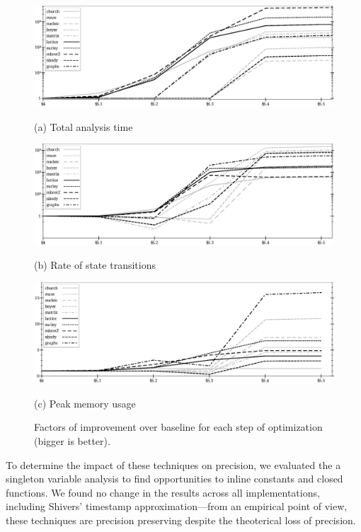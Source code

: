 \documentclass[preprint,onecolumn,9pt]{sigplanconf} %
\begin{document}
\begin{figure}
\begin{center}
  \includegraphics[width=6.5in]{all-relative-time}

  (a) Total analysis time

  \vspace{1em}
  \includegraphics[width=6.5in]{all-relative-speed}

  (b) Rate of state transitions

  \vspace{1em}
  \includegraphics[width=6.5in]{all-relative-space}

  (c) Peak memory usage
\end{center}
\caption{Factors of improvement over baseline for each step of
  optimization (bigger is better).}
\label{fig:bench-all}
\end{figure}

To determine the impact of these techniques on precision, we evaluated
the a singleton variable analysis to find opportunities to inline
constants and closed functions.  We found no change in the results
across all implementations, including Shivers' timestamp
approximation---from an empirical point of view, these techniques are
precision preserving despite the theoterical loss of precision.
\end{document}
